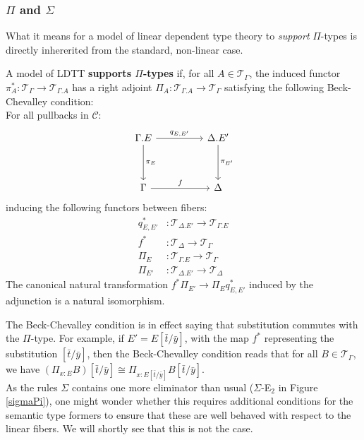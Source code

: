 \subsubsection{$\Pi$ and $\Sigma$}
What it means for a model of linear dependent type theory to \textit{support} $\Pi$-types is directly inhererited from the standard, non-linear case.
\begin{defn}A model of LDTT \textbf{supports $\Pi$-types} if, for all $A \in \mathcal{T}_{\Gamma}$, the induced functor $\pi_A^* : \mathcal{T}_{\Gamma} \to \mathcal{T}_{\Gamma.A}$ has a right adjoint $\Pi_A : \mathcal{T}_{\Gamma.A} \to \mathcal{T}_{\Gamma}$ satisfying the following Beck-Chevalley condition:\\
For all pullbacks in $\mathcal{C}$:
  \begin{equation}\label{pb-diag}
    \ti
    \Gamma.E \ar[d, "\pi_E"] \ar[r, "q_{E, E'}"] & \Delta.E' \ar[d, "\pi_{E'}"] \\
    \Gamma \ar[r, "f"] & \Delta
    \kz
  \end{equation}
inducing the following functors between fibers:
\[
  \begin{split}
    q^*_{E, E'} &: \mathcal{T}_{\Delta.E'} \to \mathcal{T}_{\Gamma.E}\\
    f^* &: \mathcal{T}_{\Delta} \to \mathcal{T}_{\Gamma}\\
    \Pi_E &: \mathcal{T}_{\Gamma.E} \to \mathcal{T}_{\Gamma}\\
    \Pi_{E'} &: \mathcal{T}_{\Delta.E'} \to \mathcal{T}_{\Delta}
  \end{split}    
\]
The canonical natural transformation $f^*\Pi_{E'} \to \Pi_{E}q^*_{E, E'}$ induced by the adjunction is a natural isomorphism.\\
\end{defn}
The Beck-Chevalley condition is in effect saying that substitution commutes with the $\Pi$-type. For example, if $E' = E[\bar t/\bar y]$, with the map $f^*$ representing the substitution $[\bar t/\bar y]$, then the Beck-Chevalley condition reads that for all $B \in \mathcal{T}_{\Gamma}$, we have $(\Pi_{x : E}B)[\bar t/\bar y] \cong \Pi_{x : E[\bar t/\bar y]}B[\bar t/\bar y]$.\\
As the rules $\Sigma$ contains one more eliminator than usual ($\Sigma$-E$_2$ in Figure \ref{sigmaPi}), one might wonder whether this requires additional conditions for the semantic type formers to ensure that these are well behaved with respect to the linear fibers. We will shortly see that this is not the case.
